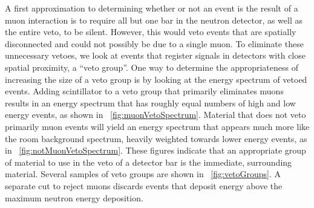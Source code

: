 A first approximation to determining whether or not an event is the result of a muon interaction is to require all but one bar in the neutron detector, as well as the entire veto, to be silent.  However, this would veto events that are spatially disconnected and could not possibly be due to a single muon.  To eliminate these unnecessary vetoes, we look at events that register signals in detectors with close spatial proximity, a ``veto group''.  One way to determine the appropriateness of increasing the size of a veto group is by looking at the energy spectrum of vetoed events.  Adding scintillator to a veto group that primarily eliminates muons results in an energy spectrum that has roughly equal numbers of high and low energy events, as shown in {\fig}~\ref{fig:muonVetoSpectrum}.  Material that does not veto primarily muon events will yield an energy spectrum that appears much more like the room background spectrum, heavily weighted towards lower energy events, as in {\fig}~\ref{fig:notMuonVetoSpectrum}.  These figures indicate that an appropriate group of material to use in the veto of a detector bar is the immediate, surrounding material.  Several samples of veto groups are shown in {\fig}~\ref{fig:vetoGroups}.  A separate cut to reject muons discards events that deposit energy above the maximum neutron energy deposition.    
